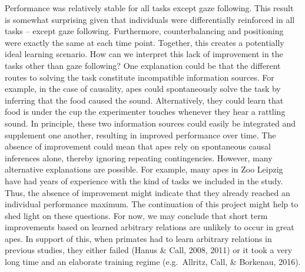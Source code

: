 \documentclass[10pt, letterpaper]{article}
\begin{document}
Performance was relatively stable for all tasks except gaze following.
This result is somewhat surprising given that individuals were
differentially reinforced in all tasks -- except gaze following.
Furthermore, counterbalancing and positioning were exactly the same at
each time point. Together, this creates a potentially ideal learning
scenario. How can we interpret this lack of improvement in the tasks
other than gaze following? One explanation could be that the different
routes to solving the task constitute incompatible information sources.
For example, in the case of causality, apes could spontaneously solve
the task by inferring that the food caused the sound. Alternatively,
they could learn that food is under the cup the experimenter touches
whenever they hear a rattling sound. In principle, these two information
sources could easily be integrated and supplement one another, resulting
in improved performance over time. The absence of improvement could mean
that apes rely on spontaneous causal inferences alone, thereby ignoring
repeating contingencies. However, many alternative explanations are
possible. For example, many apes in Zoo Leipzig have had years of
experience with the kind of tasks we included in the study. Thus, the
absence of improvement might indicate that they already reached an
individual performance maximum. The continuation of this project might
help to shed light on these questions. For now, we may conclude that
short term improvements based on learned arbitrary relations are
unlikely to occur in great apes. In support of this, when primates had
to learn arbitrary relations in previous studies, they either failed
(Hanus \& Call, 2008, 2011) or it took a very long time and an elaborate
training regime (e.g.~Allritz, Call, \& Borkenau, 2016).
\end{document}
